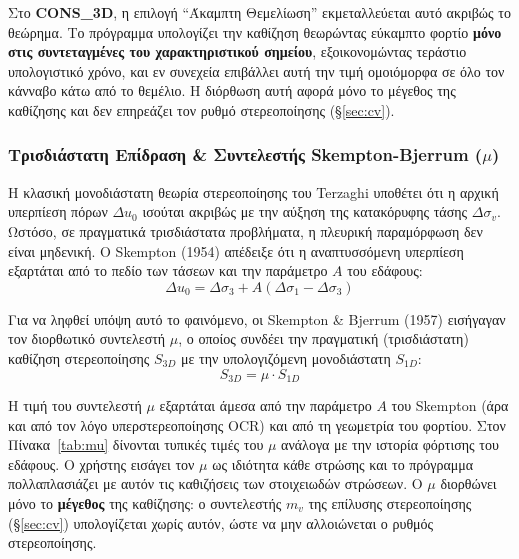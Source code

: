 \documentclass[11pt,a4paper]{article}
\newcommand{\cons}{\textbf{CONS\_3D}}
\begin{document}
Στο \cons, η επιλογή ``Άκαμπτη Θεμελίωση'' εκμεταλλεύεται αυτό ακριβώς το θεώρημα. Το πρόγραμμα υπολογίζει την καθίζηση θεωρώντας εύκαμπτο φορτίο \textbf{μόνο στις συντεταγμένες του χαρακτηριστικού σημείου}, εξοικονομώντας τεράστιο υπολογιστικό χρόνο, και εν συνεχεία επιβάλλει αυτή την τιμή ομοιόμορφα σε όλο τον κάνναβο κάτω από το θεμέλιο. Η διόρθωση αυτή αφορά μόνο το μέγεθος της καθίζησης και δεν επηρεάζει τον ρυθμό στερεοποίησης (§\ref{sec:cv}).

\subsubsection{Τρισδιάστατη Επίδραση \& Συντελεστής Skempton-Bjerrum (\texorpdfstring{$\mu$}{μ})}\label{sec:mu}

Η κλασική μονοδιάστατη θεωρία στερεοποίησης του Terzaghi υποθέτει ότι η αρχική υπερπίεση πόρων $\Delta u_0$ ισούται ακριβώς με την αύξηση της κατακόρυφης τάσης $\Delta\sigma_v$. Ωστόσο, σε πραγματικά τρισδιάστατα προβλήματα, η πλευρική παραμόρφωση δεν είναι μηδενική. Ο Skempton (1954) απέδειξε ότι η αναπτυσσόμενη υπερπίεση εξαρτάται από το πεδίο των τάσεων και την παράμετρο $A$ του εδάφους:
\begin{equation}
  \Delta u_0 = \Delta\sigma_3 + A(\Delta\sigma_1 - \Delta\sigma_3)
\end{equation}

Για να ληφθεί υπόψη αυτό το φαινόμενο, οι Skempton \& Bjerrum (1957) εισήγαγαν τον διορθωτικό συντελεστή $\mu$, ο οποίος συνδέει την πραγματική (τρισδιάστατη) καθίζηση στερεοποίησης $S_{3D}$ με την υπολογιζόμενη μονοδιάστατη $S_{1D}$:
\begin{equation}
  S_{3D} = \mu\cdot S_{1D}
\end{equation}

Η τιμή του συντελεστή $\mu$ εξαρτάται άμεσα από την παράμετρο $A$ του Skempton (άρα και από τον λόγο υπερστερεοποίησης OCR) και από τη γεωμετρία του φορτίου. Στον Πίνακα~\ref{tab:mu} δίνονται τυπικές τιμές του $\mu$ ανάλογα με την ιστορία φόρτισης του εδάφους. Ο χρήστης εισάγει τον $\mu$ ως ιδιότητα κάθε στρώσης και το πρόγραμμα πολλαπλασιάζει με αυτόν τις καθιζήσεις των στοιχειωδών στρώσεων. Ο $\mu$ διορθώνει μόνο το \textbf{μέγεθος} της καθίζησης: ο συντελεστής $m_v$ της επίλυσης στερεοποίησης (§\ref{sec:cv}) υπολογίζεται χωρίς αυτόν, ώστε να μην αλλοιώνεται ο ρυθμός στερεοποίησης.
\end{document}
